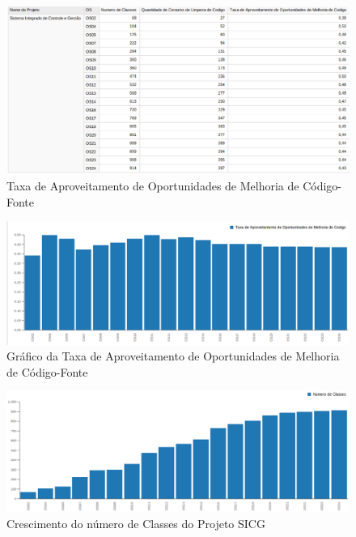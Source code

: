 \begin{figure}[H]
\centering
\includegraphics[keepaspectratio=true,scale=0.48]{figuras/taxa-parcial.eps}
\caption{Taxa de Aproveitamento de Oportunidades de Melhoria de Código-Fonte}
\label{fig:taxa-cenarios}
\end{figure}
\FloatBarrier


\begin{figure}[H]
\centering
\includegraphics[keepaspectratio=false,scale=0.48]{figuras/taxa-grafico.eps}
\caption{Gráfico da Taxa de Aproveitamento de Oportunidades de Melhoria de Código-Fonte}
\label{fig:grafico-taxa}
\end{figure}
\FloatBarrier

\begin{figure}[H]
\centering
\includegraphics[keepaspectratio=false,scale=0.48]{figuras/crescimento-projeto.eps}
\caption{Crescimento do número de Classes do Projeto SICG}
\label{fig:crescimento-projeto}
\end{figure}
\FloatBarrier


